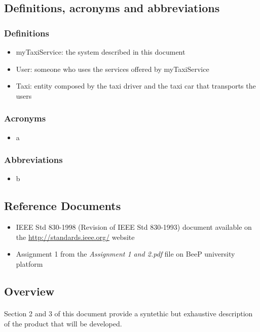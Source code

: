 	\subsection{Definitions, acronyms and abbreviations}
		\subsubsection{Definitions}
		\begin{itemize}
			\item myTaxiService: the system described in this document
			\item User: someone who uses the services offered by myTaxiService
			\item Taxi: entity composed by the taxi driver and the taxi car that transports the users
		\end{itemize}
		\subsubsection{Acronyms}
		\begin{itemize}
			\item a
		\end{itemize}
		\subsubsection{Abbreviations}
		\begin{itemize}
			\item b
		\end{itemize}
	\subsection{Reference Documents}
	\begin{itemize}
		\item IEEE Std 830-1998 (Revision of IEEE Std 830-1993) document available on the \url{http://standards.ieee.org/} website
		\item Assignment 1 from the \emph{Assignment 1 and 2.pdf} file on BeeP university platform
	\end{itemize}
	\subsection{Overview}
		\paragraph*{}Section 2 and 3 of this document provide a syntethic but exhaustive description of the product that will be developed.
				
